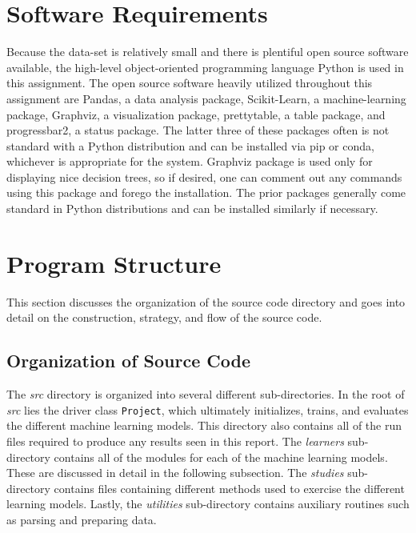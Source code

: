 \documentclass[paper=a4, fontsize=11pt]{scrartcl} %
\begin{document}
\section{Software Requirements} \label{sec: software}

Because the data-set is relatively small and there is plentiful open source software available, the high-level object-oriented programming language Python is used in this assignment.
The open source software heavily utilized throughout this assignment are Pandas, a data analysis package, Scikit-Learn, a machine-learning package, Graphviz, a visualization package, prettytable, a table package, and progressbar2, a status package. 
The latter three of these packages often is not standard with a Python distribution and can be installed via pip or conda, whichever is appropriate for the system. 
Graphviz package is used only for displaying nice decision trees, so if desired, one can comment out any commands using this package and forego the installation.
The prior packages generally come standard in Python distributions and can be installed similarly if necessary.

\section{Program Structure} \label{sec: structure}

This section discusses the organization of the source code directory and goes into detail on the construction, strategy, and flow of the source code.

\subsection*{Organization of Source Code}

The {\em src} directory is organized into several different sub-directories.
In the root of {\em src} lies the driver class \verb|Project|, which ultimately initializes, trains, and evaluates the different machine learning models.
This directory also contains all of the run files required to produce any results seen in this report.
The {\em learners} sub-directory contains all of the modules for each of the machine learning models.
These are discussed in detail in the following subsection.
The {\em studies} sub-directory contains files containing different methods used to exercise the different learning models.
Lastly, the {\em utilities} sub-directory contains auxiliary routines such as parsing and preparing data.
\end{document}
